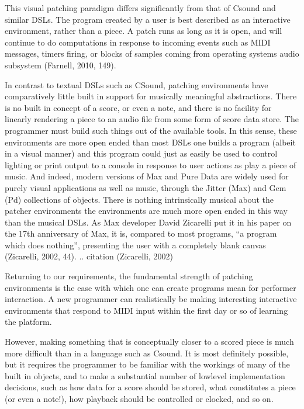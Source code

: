 \documentclass[letterpaper,10pt,english]{sphinxmanual}
\begin{document}
\sphinxAtStartPar
This visual patching paradigm differs significantly from that of Csound and similar DSLs.
The program created by a user is best described as an interactive environment, rather than a piece.
A patch runs as long as it is open, and will continue to do computations in response to
incoming events such as MIDI messages, timers firing, or blocks of samples
coming from operating systems audio subsystem (Farnell, 2010, 149).

\sphinxAtStartPar
In contrast to textual DSLs such as CSound, patching environments have comparatively
little built in support for musically meaningful abstractions.
There is no built in concept of a score, or even a note, and there is no
facility for linearly rendering a piece to an audio file from some form of score data store.
The programmer must build such things out of the available tools.
In this sense, these environments are more open ended than most DSLs \sphinxhyphen{} one
builds a program (albeit in a visual manner) and this program
could just as easily be used to control lighting or print output to a console
in response to user actions as play a piece of music. And indeed, modern versions of Max
and Pure Data are widely used for purely visual applications as well as music,
through the Jitter (Max) and Gem (Pd) collections of objects.
There is nothing intrinsically musical about the patcher environments \sphinxhyphen{}
the environments are much more open ended in this way than the musical DSLs.
As Max developer David Zicarelli put it in his paper on the 17th anniversary of Max,
it is, compared to most programs, “a program which does nothing”, presenting the user
with a completely blank canvas (Zicarelli, 2002, 44).
.. citation (Zicarelli, 2002)

\sphinxAtStartPar
Returning to our requirements, the fundamental strength of patching environments
is the ease with which one can create programs mean for performer interaction.
A new programmer can realistically be making interesting interactive environments
that respond to MIDI input within the first day or so of learning the platform.

\sphinxAtStartPar
However, making something that is conceptually closer to a scored piece is much more
difficult than in a language such as Csound.
It is most definitely possible, but it requires the programmer to be
familiar with the workings of many of the built in objects, and to make
a substantial number of low\sphinxhyphen{}level implementation decisions, such as
how data for a score should be stored, what constitutes a piece (or even a note!),
how playback should be controlled or clocked, and so on.
\end{document}

